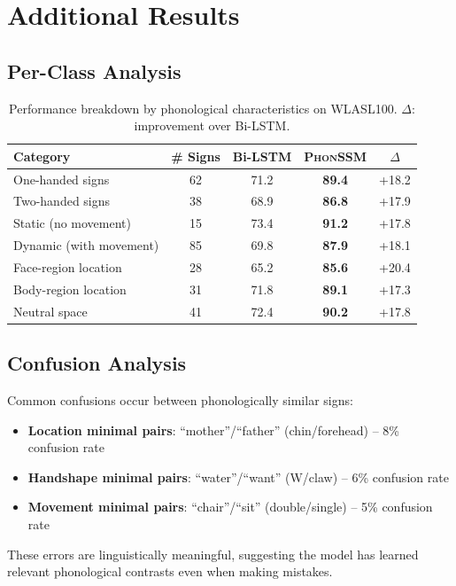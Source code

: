 \documentclass{article}
\theoremstyle{definition}
\theoremstyle{remark}
\newcommand{\phonssm}{\textsc{PhonSSM}}
\begin{document}
\section{Additional Results}

\subsection{Per-Class Analysis}

\begin{table}[ht]
\caption{Performance breakdown by phonological characteristics on WLASL100. $\Delta$: improvement over Bi-LSTM.}
\label{tab:perclass}
\vspace{-1mm}
\begin{center}
\begin{small}
\begin{tabular*}{\textwidth}{@{\extracolsep{\fill}}lcccc@{}}
\toprule
Category & \# Signs & Bi-LSTM & \phonssm{} & $\Delta$ \\
\midrule
One-handed signs & 62 & 71.2 & \textbf{89.4} & +18.2 \\
Two-handed signs & 38 & 68.9 & \textbf{86.8} & +17.9 \\
\midrule
Static (no movement) & 15 & 73.4 & \textbf{91.2} & +17.8 \\
Dynamic (with movement) & 85 & 69.8 & \textbf{87.9} & +18.1 \\
\midrule
Face-region location & 28 & 65.2 & \textbf{85.6} & +20.4 \\
Body-region location & 31 & 71.8 & \textbf{89.1} & +17.3 \\
Neutral space & 41 & 72.4 & \textbf{90.2} & +17.8 \\
\bottomrule
\end{tabular*}
\end{small}
\end{center}
\vspace{-2mm}
\end{table}

\subsection{Confusion Analysis}

Common confusions occur between phonologically similar signs:
\begin{itemize}[nosep,topsep=3pt,leftmargin=*]
\item \textbf{Location minimal pairs}: ``mother''/``father'' (chin/forehead) -- 8\% confusion rate
\item \textbf{Handshape minimal pairs}: ``water''/``want'' (W/claw) -- 6\% confusion rate
\item \textbf{Movement minimal pairs}: ``chair''/``sit'' (double/single) -- 5\% confusion rate
\end{itemize}
\vspace{1mm}
These errors are linguistically meaningful, suggesting the model has learned relevant phonological contrasts even when making mistakes.
\end{document}
